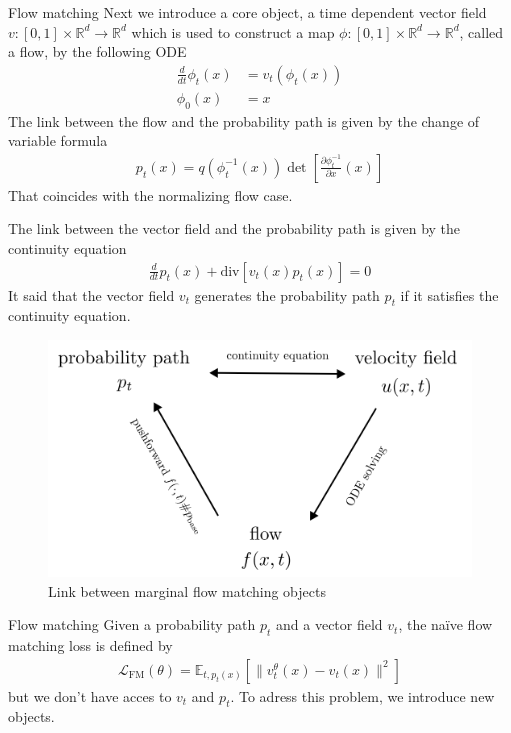 \documentclass{beamer}
\begin{document}
\begin{frame}{Flow matching}
    Next we introduce a core object, a time dependent vector field \(v:[0,1]\times\mathbb{R}^d\rightarrow \mathbb{R}^d\) which is used to construct a map \(\phi:[0,1]\times\mathbb{R}^d\rightarrow\mathbb{R}^d\), called a flow, by the following ODE
    \begin{align}
        \frac{d}{dt}\phi_t(x)&=v_t(\phi_t(x)) \\
        \phi_0(x)&=x \nonumber
    \end{align}
    The link between the flow and the probability path is given by the change of variable formula
    \begin{align}
        p_t(x)=q(\phi_t^{-1}(x))\det \left[\frac{\partial\phi_t^{-1}}{\partial x}(x)\right]
    \end{align}
    That coincides with the normalizing flow case.
\end{frame}

\begin{frame}
    The link between the vector field and the probability path is given by the continuity equation 
    \begin{align}
        \frac{d}{dt}p_t(x)+\text{div}\left[v_t(x)p_t(x)\right]=0
    \end{align}
    It said that the vector field \(v_t\) generates the probability path \(p_t\) if it satisfies the continuity equation.\\

    \begin{figure}[b]
        \centering
        \includegraphics[width=0.7\linewidth]{images/LinkBetweenObjects.png}
        \caption{Link between marginal flow matching objects}
        \label{fig:flow_matching}
    \end{figure}
\end{frame}

\begin{frame}{Flow matching}
    Given a probability path \(p_t\) and a vector field \(v_t\), the naïve flow matching loss is defined by
    \begin{align}
        \mathcal{L}_\text{FM}(\theta)=\mathbb{E}_{t,p_t(x)}\left[ \| v_t^\theta(x)-v_t(x)\|^2 \right]
    \end{align}
    but we don't have acces to \(v_t\) and \(p_t\).
    \bigskip
    To adress this problem, we introduce new objects. 
\end{frame}
\end{document}
